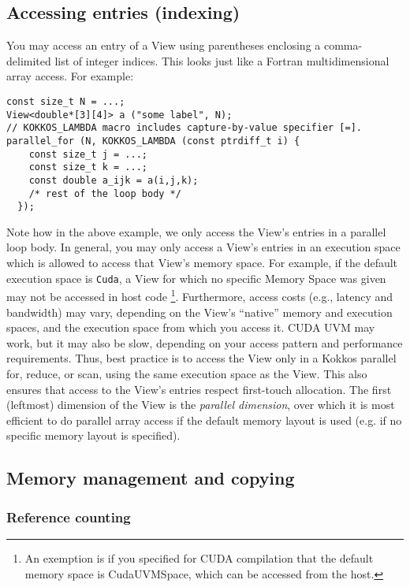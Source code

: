 \subsection{Accessing entries (indexing)}

You may access an entry of a View using parentheses enclosing a
comma-delimited list of integer indices.  This looks just like a
Fortran multidimensional array access.  For example:
\begin{lstlisting}
const size_t N = ...;
View<double*[3][4]> a ("some label", N);
// KOKKOS_LAMBDA macro includes capture-by-value specifier [=].
parallel_for (N, KOKKOS_LAMBDA (const ptrdiff_t i) {
    const size_t j = ...;
    const size_t k = ...;
    const double a_ijk = a(i,j,k);
    /* rest of the loop body */
  });
\end{lstlisting}
Note how in the above example, we only access the View's entries in a
parallel loop body.  In general, you may only access a View's entries
in an execution space which is allowed to access that View's memory
space.  For example, if the default execution space is \lstinline!Cuda!, 
a View for which no specific Memory Space was given may not be accessed 
in host code \footnote{An exemption is if you specified for CUDA compilation
that the default memory space is CudaUVMSpace, which can be accessed from 
the host.}.
Furthermore, access costs (e.g., latency and
bandwidth) may vary, depending on the View's ``native'' memory and
execution spaces, and the execution space from which you access it.
CUDA UVM may work, but it may also be slow, depending on your access
pattern and performance requirements.  Thus, best practice is to
access the View only in a Kokkos parallel for, reduce, or scan, using
the same execution space as the View.  This also ensures that access
to the View's entries respect first-touch allocation.  The first
(leftmost) dimension of the View is the \emph{parallel dimension},
over which it is most efficient to do parallel array access if the 
default memory layout is used (e.g. if no specific memory layout is 
specified).

\subsection{Memory management and copying}

\subsubsection{Reference counting}

